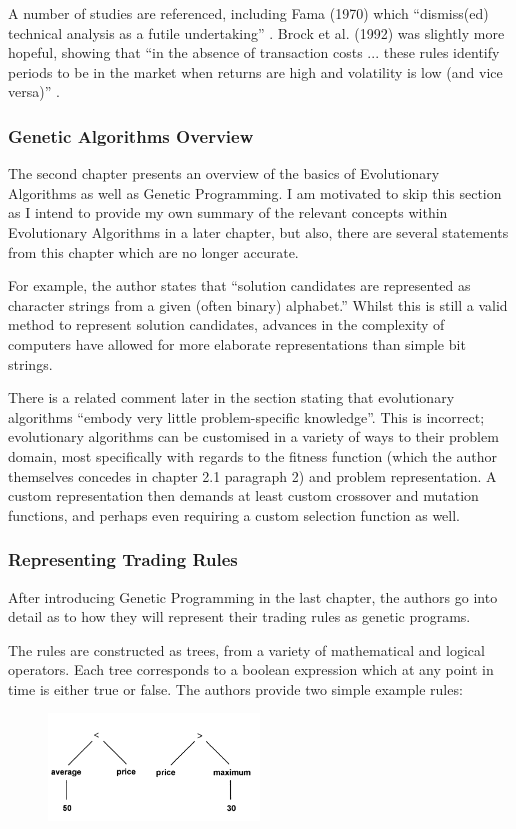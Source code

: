 A number of studies are referenced, including Fama (1970) which ``dismiss(ed) technical analysis as a futile undertaking'' \cite{fama70}. Brock et al. (1992) was slightly more hopeful, showing that ``in the absence of transaction costs ... these rules identify periods to be in the market when returns are high and volatility is low (and vice versa)'' \cite{brock92}.

\subsubsection{Genetic Algorithms Overview}
The second chapter presents an overview of the basics of Evolutionary Algorithms as well as Genetic Programming. I am motivated to skip this section as I intend to provide my own summary of the relevant concepts within Evolutionary Algorithms in a later chapter, but also, there are several statements from this chapter which are no longer accurate. \newline

For example, the author states that ``solution candidates are represented as character strings from a given (often binary) alphabet.'' Whilst this is still a valid method to represent solution candidates, advances in the complexity of computers have allowed for more elaborate representations than simple bit strings. \newline

There is a related comment later in the section stating that evolutionary algorithms ``embody very little problem-specific knowledge''. This is incorrect; evolutionary algorithms can be customised in a variety of ways to their problem domain, most specifically with regards to the fitness function (which the author themselves concedes in chapter 2.1 paragraph 2) and problem representation. A custom representation then demands at least custom crossover and mutation functions, and perhaps even requiring a custom selection function as well.

\subsubsection{Representing Trading Rules}
After introducing Genetic Programming in the last chapter, the authors go into detail as to how they will represent their trading rules as genetic programs. \newline

The rules are constructed as trees, from a variety of mathematical and logical operators. Each tree corresponds to a boolean expression which at any point in time is either true or false. The authors provide two simple example rules:
\begin{figure}[h]
    \centering
    \includegraphics[width=0.5\textwidth]{images/averageAndMax.png}
\end{figure}

